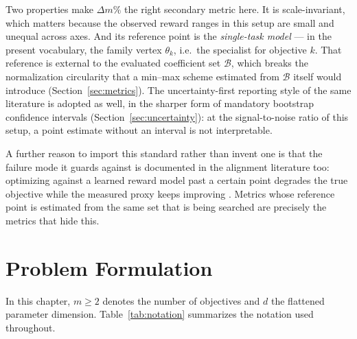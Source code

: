 \documentclass[12pt,a4paper]{report}
\newcommand{\1}{\mathbf{1}}
\newcommand{\Bset}{\mathcal{B}}
\theoremstyle{definition}
\begin{document}
Two properties make \(\Delta m\%\) the right secondary metric here. It is scale-invariant, which matters because the observed reward ranges in this setup are small and unequal across axes. And its reference point is the \emph{single-task model} --- in the present vocabulary, the family vertex \(\theta_k\), i.e.\ the specialist for objective \(k\). That reference is external to the evaluated coefficient set \(\Bset\), which breaks the normalization circularity that a min--max scheme estimated from \(\Bset\) itself would introduce (Section~\ref{sec:metrics}). The uncertainty-first reporting style of the same literature is adopted as well, in the sharper form of mandatory bootstrap confidence intervals (Section~\ref{sec:uncertainty}): at the signal-to-noise ratio of this setup, a point estimate without an interval is not interpretable.

A further reason to import this standard rather than invent one is that the failure mode it guards against is documented in the alignment literature too: optimizing against a learned reward model past a certain point degrades the true objective while the measured proxy keeps improving \citep{gao2023overoptimization}. Metrics whose reference point is estimated from the same set that is being searched are precisely the metrics that hide this.

\chapter{Problem Formulation}
\label{chap:problem}

In this chapter, \(m\ge 2\) denotes the number of objectives and \(d\) the flattened parameter dimension. Table~\ref{tab:notation} summarizes the notation used throughout.
\end{document}
